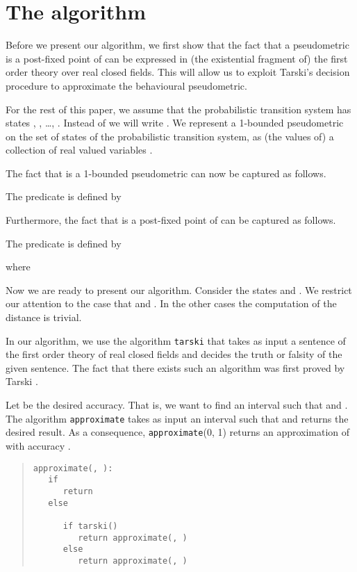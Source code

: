 \documentclass{LMCS}
\begin{document}
\section{The algorithm}
\label{section:6}

Before we present our algorithm, we first show that the fact that a pseudometric
is a post-fixed point of  can be expressed in (the existential 
fragment of) the first order theory over real closed fields.
This will allow us to exploit Tarski's decision procedure to
approximate the behavioural pseudometric.  

For the rest of this paper, we assume that the probabilistic transition system 
has  states , , \ldots, .  Instead of  
we will write .  We represent a 1-bounded
pseudometric on the set  of states of the probabilistic transition
system, as (the values of) a collection of real valued variables . 

The fact that  is a 1-bounded pseudometric can now be captured as follows.

\begin{defi}
The predicate  is defined by

\end{defi}

Furthermore, the fact that  is a post-fixed point of  can be captured as follows.

\begin{defi}
The predicate  is defined by

where

\end{defi}

Now we are ready to present our algorithm.  Consider the states
 and .  We restrict our attention to the case 
that  and .  In the
other cases the computation of the distance is trivial.

In our algorithm, we use the algorithm {\tt tarski} that takes 
as input a sentence of the first order theory of real closed fields 
and decides the truth or falsity of the given sentence.  The fact 
that there exists such an algorithm was first proved by Tarski \cite{T51}.

Let  be the desired accuracy.  That is, we want to find an 
interval  such that  
and .
The algorithm {\tt approximate} takes as input an interval
 such that 
and returns the desired result.  As a consequence, {\tt approximate}(0, 1)
returns an approximation of  with accuracy .

\begin{quote}
\begin{lstlisting}
approximate(, ):
   if 
      return 
   else
      
      if tarski()
         return approximate(, )
      else
         return approximate(, )
\end{lstlisting}
\end{quote}
\end{document}
